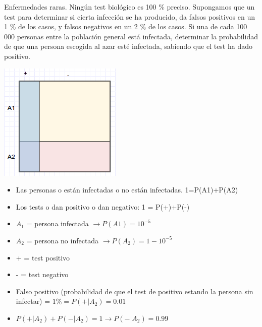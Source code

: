 \begin{problem}[3]Enfermedades raras. Ning\'un test biol\'ogico es 100 $\%$ preciso. Supongamos que un test para
determinar si cierta infecci\'on se ha producido, da falsos positivos en un 1 $\%$ de los casos, y falsos
negativos en un 2 $\%$  de los casos. Si una de cada 100 000 personas entre la poblaci\'on general est\'a
infectada, determinar la probabilidad de que una persona escogida al azar est\'e infectada, sabiendo
que el test ha dado positivo.
\solution

\begin{expla}

\begin{center}
\includegraphics[scale=0.75]{img/Dvenn5.png}
\end{center}


\begin{itemize}

\item Las personas o están infectadas o no están infectadas. 1=P(A1)+P(A2)

\item Los tests o dan positivo o dan negativo: 1 = P(+)+P(-)

\item $A_1$ = persona infectada $\rightarrow P(A1)=10^{-5}$

\item $A_2$ = persona no infectada $\rightarrow P(A_2)=1-10^{-5}$

\item + = test positivo

\item - = test negativo

\item Falso positivo (probabilidad de que el test de positivo estando la persona sin infectar) = $1\% = P(+|A_2)=0.01$

\item $P(+|A_2)+P(-|A_2)=1 \rightarrow P(-|A_2)=0.99$


\end{itemize}
\end{expla}
\end{problem}
